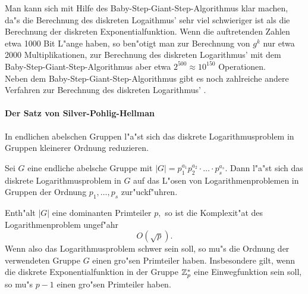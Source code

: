 {Man kann sich mit Hilfe des Baby-Step-Giant-Step-Algorithmus klar machen, da"s die Berechnung des diskreten Logaithmus' sehr viel schwieriger ist als die Berechnung der diskreten Exponentialfunktion. Wenn die auftretenden Zahlen etwa 1000 Bit L"ange haben, so ben"otigt man zur Berechnung von $ g^k $ nur etwa 2000 Multiplikationen, zur Berechnung des diskreten Logarithmus' mit dem Baby-Step-Giant-Step-Algorithmus aber etwa $ 2^{500} \approx 10^{150} $ Operationen. \\
Neben dem Baby-Step-Giant-Step-Algorithmus gibt es noch zahlreiche andere Verfahren zur Berechnung des diskreten Logarithmus' \cite{Stinson1995}.

\paragraph{Der Satz von Silver-Pohlig-Hellman}
In endlichen abelschen Gruppen l"a"st sich das  diskrete Logarithmusproblem in Gruppen kleinerer Ordnung reduzieren.
\begin{satz}\label{thm-cry-pohe}
Sei $ G $ eine endliche abelsche Gruppe mit $ |G|= p_1^{a_1} p_2^{a_2} \cdot \ldots \cdot p_s^{a_s}. $ Dann l"a"st sich das diskrete Logarithmusproblem in $ G $ auf das L"osen von Logarithmenproblemen in Gruppen der Ordnung $ p_1, \ldots , p_s $ zur"uckf"uhren.
\end{satz}

Enth"alt $ |G| $ eine \glqq dominanten\grqq {} Primteiler $ p ,$ so ist die Komplexit"at  des Logarithmenproblem ungef"ahr
\[ O(\sqrt{p}). \]
Wenn also das Logarithmusproblem schwer sein soll, so mu"s die Ordnung der verwendeten Gruppe $ G $ einen gro"sen Primteiler haben. Insbesondere gilt, wenn die diskrete Exponentialfunktion in der Gruppe $ \mathbf{\mathbb{Z}}_p^{\ast} $ eine Einwegfunktion sein soll, so mu"s $ p -1 $ einen gro"sen Primteiler haben.


\begin{center}
\end{center}


}
